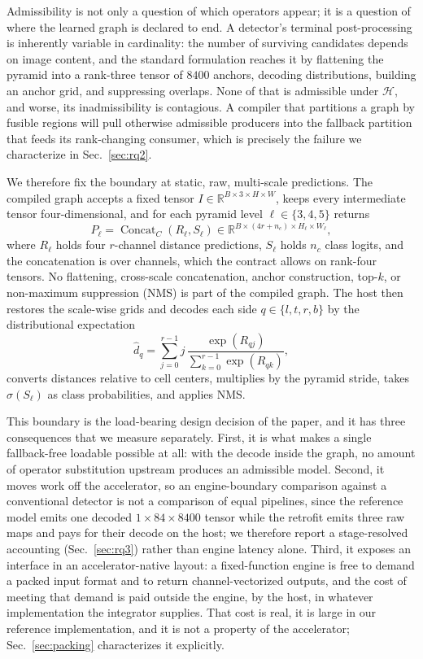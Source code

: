 Admissibility is not only a question of which operators appear; it is a question
of where the learned graph is declared to end. A detector's terminal
post-processing is inherently variable in cardinality: the number of surviving
candidates depends on image content, and the standard formulation reaches it by
flattening the pyramid into a rank-three tensor of $8400$ anchors, decoding
distributions, building an anchor grid, and suppressing overlaps. None of that
is admissible under $\mathcal{H}$, and worse, its inadmissibility is
contagious. A compiler that partitions a graph by fusible regions will pull
otherwise admissible producers into the fallback partition that feeds its
rank-changing consumer, which is precisely the failure we characterize in
Sec.~\ref{sec:rq2}.

We therefore fix the boundary at static, raw, multi-scale predictions. The
compiled graph accepts a fixed tensor
$I\in\mathbb{R}^{B\times3\times H\times W}$, keeps every intermediate tensor
four-dimensional, and for each pyramid level $\ell\in\{3,4,5\}$ returns
\begin{equation}
P_\ell=\operatorname{Concat}_{C}(R_\ell,S_\ell)
\in\mathbb{R}^{B\times(4r+n_c)\times H_\ell\times W_\ell},
\label{eq:packed}
\end{equation}
where $R_\ell$ holds four $r$-channel distance predictions, $S_\ell$ holds
$n_c$ class logits, and the concatenation is over channels, which the contract
allows on rank-four tensors. No flattening, cross-scale concatenation, anchor
construction, top-$k$, or non-maximum suppression (NMS) is part of the compiled
graph. The host then restores the scale-wise grids and decodes each side
$q\in\{l,t,r,b\}$ by the distributional expectation
\begin{equation}
\hat d_q=\sum_{j=0}^{r-1}j\,
\frac{\exp(R_{qj})}{\sum_{k=0}^{r-1}\exp(R_{qk})},
\label{eq:dfl}
\end{equation}
converts distances relative to cell centers, multiplies by the pyramid stride,
takes $\sigma(S_\ell)$ as class probabilities, and applies NMS.

This boundary is the load-bearing design decision of the paper, and it has three
consequences that we measure separately. First, it is what makes a single
fallback-free loadable possible at all: with the decode inside the graph, no
amount of operator substitution upstream produces an admissible model. Second,
it moves work off the accelerator, so an engine-boundary comparison against a
conventional detector is not a comparison of equal pipelines, since the
reference model emits one decoded $1\times84\times8400$ tensor while the
retrofit emits three raw maps and pays for their decode on the host; we
therefore report a stage-resolved accounting (Sec.~\ref{sec:rq3}) rather than
engine latency alone. Third, it exposes an interface in an accelerator-native
layout: a fixed-function engine is free to demand a packed input format and to
return channel-vectorized outputs, and the cost of meeting that demand is paid
outside the engine, by the host, in whatever implementation the integrator
supplies. That cost is real, it is large in our reference implementation, and it
is not a property of the accelerator; Sec.~\ref{sec:packing} characterizes it
explicitly.

